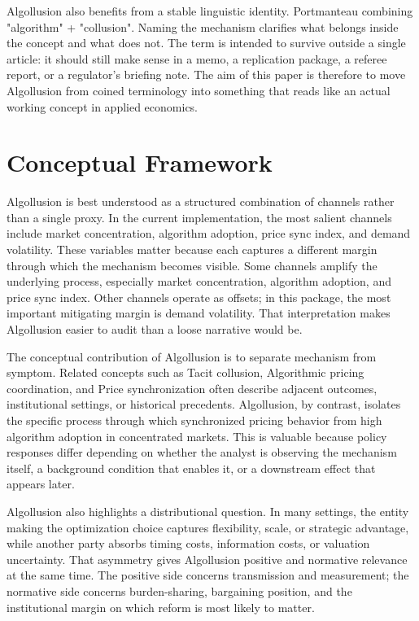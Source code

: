 \documentclass[12pt]{article}
\begin{document}
Algollusion also benefits from a stable linguistic identity. Portmanteau combining "algorithm" + "collusion". Naming the mechanism clarifies what belongs inside the concept and what does not. The term is intended to survive outside a single article: it should still make sense in a memo, a replication package, a referee report, or a regulator's briefing note. The aim of this paper is therefore to move Algollusion from coined terminology into something that reads like an actual working concept in applied economics.

\section{Conceptual Framework}
Algollusion is best understood as a structured combination of channels rather than a single proxy. In the current implementation, the most salient channels include market concentration, algorithm adoption, price sync index, and demand volatility. These variables matter because each captures a different margin through which the mechanism becomes visible. Some channels amplify the underlying process, especially market concentration, algorithm adoption, and price sync index. Other channels operate as offsets; in this package, the most important mitigating margin is demand volatility. That interpretation makes Algollusion easier to audit than a loose narrative would be.

The conceptual contribution of Algollusion is to separate mechanism from symptom. Related concepts such as Tacit collusion, Algorithmic pricing coordination, and Price synchronization often describe adjacent outcomes, institutional settings, or historical precedents. Algollusion, by contrast, isolates the specific process through which synchronized pricing behavior from high algorithm adoption in concentrated markets. This is valuable because policy responses differ depending on whether the analyst is observing the mechanism itself, a background condition that enables it, or a downstream effect that appears later.

Algollusion also highlights a distributional question. In many settings, the entity making the optimization choice captures flexibility, scale, or strategic advantage, while another party absorbs timing costs, information costs, or valuation uncertainty. That asymmetry gives Algollusion positive and normative relevance at the same time. The positive side concerns transmission and measurement; the normative side concerns burden-sharing, bargaining position, and the institutional margin on which reform is most likely to matter.
\end{document}
